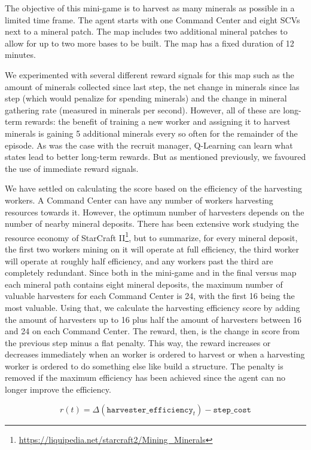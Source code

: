 The objective of this mini-game is to harvest as many minerals as possible in a limited time frame. The agent starts with one Command Center and eight SCVs next to a mineral patch. The map includes two additional mineral patches to allow for up to two more bases to be built. The map has a fixed duration of 12 minutes.

We experimented with several different reward signals for this map such as the amount of minerals collected since last step, the net change in minerals since las step (which would penalize for spending minerals) and the change in mineral gathering rate (measured in minerals per second). However, all of these are long-term rewards: the benefit of training a new worker and assigning it to harvest minerals is gaining 5 additional minerals every so often for the remainder of the episode. As was the case with the recruit manager, Q-Learning can learn what states lead to better long-term rewards. But as mentioned previously, we favoured the use of immediate reward signals.

We have settled on calculating the score based on the efficiency of the harvesting workers. A Command Center can have any number of workers harvesting resources towards it. However, the optimum number of harvesters depends on the number of nearby mineral deposits. There has been extensive work studying the resource economy of StarCraft II\footnote{\url{https://liquipedia.net/starcraft2/Mining_Minerals}}, but to summarize, for every mineral deposit, the first two workers mining on it will operate at full efficiency, the third worker will operate at roughly half efficiency, and any workers past the third are completely redundant. Since both in the mini-game and in the final versus map each mineral path contains eight mineral deposits, the maximum number of valuable harvesters for each Command Center is 24, with the first 16 being the most valuable. Using that, we calculate the harvesting efficiency score by adding the amount of harvesters up to 16 plus half the amount of harvesters between 16 and 24 on each Command Center. The reward, then, is the change in score from the previous step minus a flat penalty. This way, the reward increases or decreases immediately when an worker is ordered to harvest or when a harvesting worker is ordered to do something else like build a structure. The penalty is removed if the maximum efficiency has been achieved since the agent can no longer improve the efficiency.

$$
r(t) = \Delta(\texttt{harvester\_efficiency}_{t}) - \texttt{step\_cost}
$$

